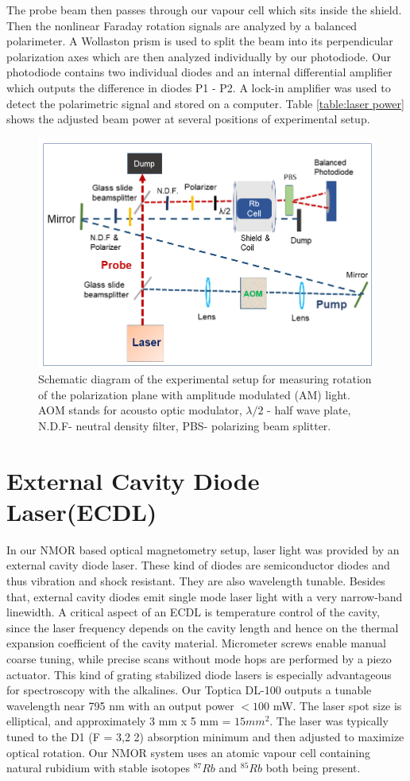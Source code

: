 The probe beam then passes through our vapour cell which sits inside the shield. Then the nonlinear Faraday rotation signals are analyzed by a balanced polarimeter.  A Wollaston prism is used to
split the beam into its perpendicular polarization axes which are then
analyzed individually by our photodiode. Our photodiode contains two
individual diodes and an internal differential amplifier which outputs the difference in diodes P1 - P2. A lock-in amplifier was used to detect the polarimetric signal and stored on a computer. Table \ref{table:laser power} shows the adjusted beam power at several positions of experimental setup.
\begin{figure}%
\centering
\includegraphics[width=0.95\linewidth]{figures/experimental_setup}
\caption{Schematic diagram of the experimental setup for measuring
  rotation of the polarization plane with amplitude modulated (AM)
  light. AOM stands for acousto optic modulator, $\lambda/2$ - half
  wave plate, N.D.F- neutral density filter, PBS- polarizing beam
  splitter.\label{fig:pumpprobe}}
\end{figure}
\section{External Cavity Diode Laser(ECDL)}
\bigskip
In our NMOR based optical magnetometry setup, laser light was provided by an external cavity diode laser. These kind of diodes are semiconductor diodes and thus vibration and shock resistant. They are also wavelength tunable. Besides that, external cavity diodes emit single mode laser light with a very narrow-band linewidth. A critical aspect of an ECDL is temperature control of the cavity, since the laser frequency depends on the cavity length and hence on the thermal expansion coefficient of the cavity material. Micrometer screws enable manual coarse tuning, while precise scans without mode hops are performed by a piezo actuator. This kind of grating stabilized diode lasers is especially advantageous for spectroscopy with the alkalines. Our Toptica DL-100 outputs a tunable wavelength near 795 nm with an output power $<100$ mW. The laser spot size is elliptical, and approximately 3 mm x 5 mm = $15 mm^2$. The laser was typically tuned to the D1 (F = 3,2 2) absorption minimum and then adjusted to maximize optical rotation. Our NMOR system uses an atomic vapour cell containing natural rubidium with stable isotopes $^{87}Rb$ and $^{85}Rb$ both being present.

